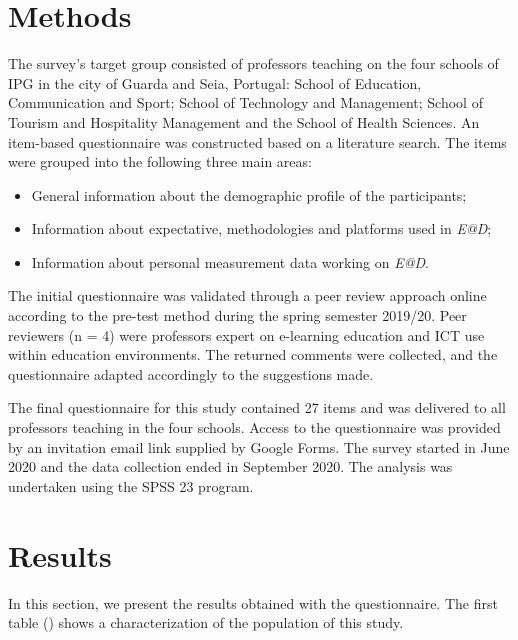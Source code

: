 \documentclass{textolivre}
\begin{document}
\section{Methods}
The survey's target group consisted of professors teaching on the four schools of IPG in the city of Guarda and Seia, Portugal: School of Education, Communication and Sport; School of Technology and Management; School of Tourism and Hospitality Management and the School of Health Sciences. An item-based questionnaire was constructed based on a literature search. The items were grouped into the following three main areas:

\begin{itemize}
    \item General information about the demographic profile of the participants;
    \item Information about expectative, methodologies and platforms used in \emph{E@D};
    \item Information about personal measurement data working on \emph{E@D}.
\end{itemize}

The initial questionnaire was validated through a peer review approach online according to the pre-test method during the spring semester 2019/20. Peer reviewers (n = 4) were professors expert on e-learning education and ICT use within education environments. The returned comments were collected, and the questionnaire adapted accordingly to the suggestions made.

The final questionnaire for this study contained 27 items and was delivered to all professors teaching in the four schools. Access to the questionnaire was provided by an invitation email link supplied by Google Forms. The survey started in June 2020 and the data collection ended in September 2020. The analysis was undertaken using the SPSS 23 program. 

\section{Results}
In this section, we present the results obtained with the questionnaire. The first table () shows a characterization of the population of this study.  
\end{document}
